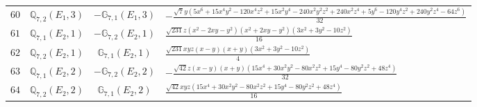 \documentclass[fleqn,8pt,landscape]{jsarticle}
\begin{document}
\begin{table}[ht!]
\begin{center}
\begin{tabular}{cccl}
$ 60 $ & $ \mathbb{Q}_{7,2}(E_{1},3) $ & $ -\mathbb{G}_{7,1}(E_{1},3) $ & $ - \frac{\sqrt{7} y \left(5 x^{6} + 15 x^{4} y^{2} - 120 x^{4} z^{2} + 15 x^{2} y^{4} - 240 x^{2} y^{2} z^{2} + 240 x^{2} z^{4} + 5 y^{6} - 120 y^{4} z^{2} + 240 y^{2} z^{4} - 64 z^{6}\right)}{32} $ \\
$ 61 $ & $ \mathbb{Q}_{7,1}(E_{2},1) $ & $ -\mathbb{G}_{7,2}(E_{2},1) $ & $ \frac{\sqrt{231} z \left(x^{2} - 2 x y - y^{2}\right) \left(x^{2} + 2 x y - y^{2}\right) \left(3 x^{2} + 3 y^{2} - 10 z^{2}\right)}{16} $ \\
$ 62 $ & $ \mathbb{Q}_{7,2}(E_{2},1) $ & $ \mathbb{G}_{7,1}(E_{2},1) $ & $ \frac{\sqrt{231} x y z \left(x - y\right) \left(x + y\right) \left(3 x^{2} + 3 y^{2} - 10 z^{2}\right)}{4} $ \\
$ 63 $ & $ \mathbb{Q}_{7,1}(E_{2},2) $ & $ -\mathbb{G}_{7,2}(E_{2},2) $ & $ - \frac{\sqrt{42} z \left(x - y\right) \left(x + y\right) \left(15 x^{4} + 30 x^{2} y^{2} - 80 x^{2} z^{2} + 15 y^{4} - 80 y^{2} z^{2} + 48 z^{4}\right)}{32} $ \\
$ 64 $ & $ \mathbb{Q}_{7,2}(E_{2},2) $ & $ \mathbb{G}_{7,1}(E_{2},2) $ & $ \frac{\sqrt{42} x y z \left(15 x^{4} + 30 x^{2} y^{2} - 80 x^{2} z^{2} + 15 y^{4} - 80 y^{2} z^{2} + 48 z^{4}\right)}{16} $ \\
 \hline \hline
\end{tabular}
\end{center}
\end{table}
\end{document}
